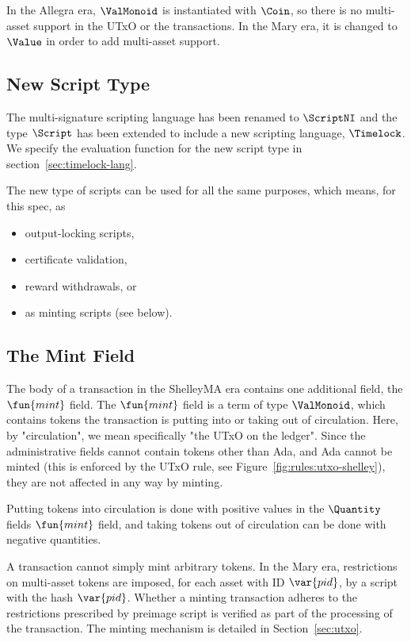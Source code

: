 In the Allegra era, $\ValMonoid$ is instantiated with $\Coin$, so there is no
multi-asset support in the UTxO or the transactions. In the Mary era, it
is changed to $\Value$ in order to add multi-asset support.

\subsection*{New Script Type}

The multi-signature scripting language has been renamed to $\ScriptNI$ and
the type $\Script$ has been extended to include a new scripting language,
$\Timelock$. We specify the evaluation
function for the new script type in section~\ref{sec:timelock-lang}.

The new type of scripts can be used for all the same purposes, which means, for this
spec, as

\begin{itemize}
  \item output-locking scripts,
  \item certificate validation,
  \item reward withdrawals, or
  \item as minting scripts (see below).
\end{itemize}

\subsection*{The Mint Field}

The body of a transaction in the ShelleyMA era contains one additional
field, the $\fun{mint}$ field.
The $\fun{mint}$ field is a term of type $\ValMonoid$, which contains
tokens the transaction is putting into or taking out of
circulation. Here, by "circulation", we mean specifically "the UTxO on the
ledger". Since the administrative fields cannot contain tokens other than Ada,
and Ada cannot be minted (this is enforced by the UTxO rule, see Figure~\ref{fig:rules:utxo-shelley}),
they are not affected in any way by minting.

Putting tokens into circulation is done with positive values in the $\Quantity$
fields $\fun{mint}$ field, and taking tokens out of circulation can be done
with negative quantities.

A transaction cannot simply mint arbitrary tokens. In the Mary era, restrictions on
multi-asset tokens are imposed, for each asset with ID $\var{pid}$, by a script
with the hash $\var{pid}$. Whether a minting transaction adheres to the restrictions
prescribed by preimage script is verified as part of the processing of the transaction.
The minting mechanism is detailed in Section~\ref{sec:utxo}.

